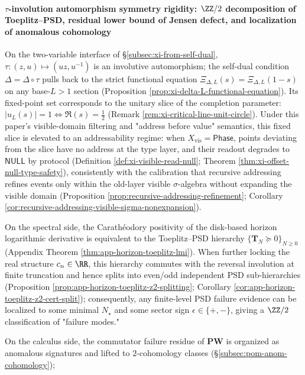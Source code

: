 \paragraph{\texorpdfstring{$\tau$}{tau}-involution automorphism symmetry rigidity: \texorpdfstring{$\ZZ/2$}{Z/2} decomposition of Toeplitz--PSD, residual lower bound of Jensen defect, and localization of anomalous cohomology}
On the two-variable interface of \S\ref{subsec:xi-from-self-dual}, \(\tau:(z,u)\mapsto(uz,u^{-1})\) is an involutive automorphism;
the self-dual condition \(\Delta=\Delta\circ\tau\) pulls back to the strict functional equation \(\Xi_{\Delta,L}(s)=\Xi_{\Delta,L}(1-s)\) on any base-\(L>1\) section (Proposition \ref{prop:xi-delta-L-functional-equation}).
Its fixed-point set corresponds to the unitary slice of the completion parameter: \(|u_L(s)|=1\iff \Re(s)=\tfrac12\) (Remark \ref{rem:xi-critical-line-unit-circle}).
Under this paper's visible-domain filtering and "address before value" semantics, this fixed slice is elevated to an addressability regime: when \(X_{\mathrm{vis}}=\mathsf{Phase}\), points deviating from the slice have no address at the type layer, and their readout degrades to \(\mathsf{NULL}\) by protocol (Definition \ref{def:xi-visible-read-null}; Theorem \ref{thm:xi-offset-null-type-safety}), consistently with the calibration that recursive addressing refines events only within the old-layer visible \(\sigma\)-algebra without expanding the visible domain (Proposition \ref{prop:recursive-addressing-refinement}; Corollary \ref{cor:recursive-addressing-visible-sigma-nonexpansion}).
\par
On the spectral side, the Carath\'eodory positivity of the disk-based horizon logarithmic derivative is equivalent to the Toeplitz--PSD hierarchy \(\{\mathbf{T}_N\succeq 0\}_{N\ge 0}\) (Appendix Theorem \ref{thm:app-horizon-toeplitz-lmi}).
When further locking the real structure \(c_n\in\RR\), this hierarchy commutes with the reversal involution at finite truncation and hence splits into even/odd independent PSD sub-hierarchies (Proposition \ref{prop:app-horizon-toeplitz-z2-splitting}; Corollary \ref{cor:app-horizon-toeplitz-z2-cert-split});
consequently, any finite-level PSD failure evidence can be localized to some minimal \(N_\star\) and some sector sign \(\epsilon\in\{+,-\}\), giving a \(\ZZ/2\) classification of "failure modes."
\par
On the calculus side, the commutator failure residue of \(\mathbf{PW}\) is organized as anomalous signatures and lifted to \(2\)-cohomology classes (\S\ref{subsec:pom-anom-cohomology});
